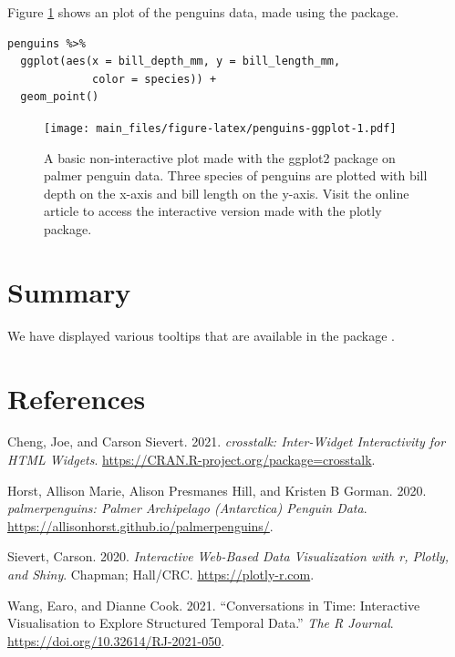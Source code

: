 Figure \ref{fig:penguins-ggplot} shows an plot of the penguins data, made using the  package.

\begin{verbatim}
penguins %>% 
  ggplot(aes(x = bill_depth_mm, y = bill_length_mm, 
             color = species)) + 
  geom_point()
\end{verbatim}

\begin{figure}
\centering
\texttt{[image: main\_files/figure-latex/penguins-ggplot-1.pdf]}
\caption{\label{fig:penguins-ggplot}A basic non-interactive plot made with the ggplot2 package on palmer penguin data. Three species of penguins are plotted with bill depth on the x-axis and bill length on the y-axis. Visit the online article to access the interactive version made with the plotly package.}
\end{figure}

\section{Summary}\label{summary}

We have displayed various tooltips that are available in the package .

\section*{References}\label{references}

\label{refs}
\begin{CSLReferences}{1}{0}
Cheng, Joe, and Carson Sievert. 2021. \emph{{crosstalk}: Inter-Widget Interactivity for HTML Widgets}. \url{https://CRAN.R-project.org/package=crosstalk}.

Horst, Allison Marie, Alison Presmanes Hill, and Kristen B Gorman. 2020. \emph{{palmerpenguins}: Palmer Archipelago (Antarctica) Penguin Data}. \url{https://allisonhorst.github.io/palmerpenguins/}.

Sievert, Carson. 2020. \emph{{Interactive Web-Based Data Visualizatio}n with r, Plotly, and Shiny}. Chapman; Hall/CRC. \url{https://plotly-r.com}.

Wang, Earo, and Dianne Cook. 2021. {``Conversations in Time: Interactive Visualisation to Explore Structured Temporal Data.''} \emph{The R Journal}. \url{https://doi.org/10.32614/RJ-2021-050}.

\end{CSLReferences}



